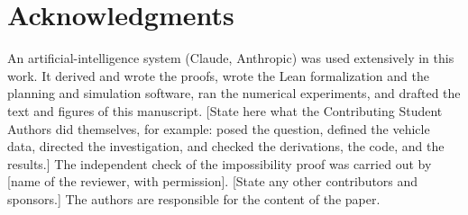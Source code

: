 \section*{Acknowledgments}
An artificial-intelligence system (Claude, Anthropic) was used extensively in this work. It derived and wrote the proofs,
wrote the Lean formalization and the planning and simulation software, ran the numerical experiments, and drafted the text
and figures of this manuscript. [State here what the Contributing Student Authors did themselves, for example: posed the
question, defined the vehicle data, directed the investigation, and checked the derivations, the code, and the results.] The
independent check of the impossibility proof was carried out by [name of the reviewer, with permission]. [State any other
contributors and sponsors.] The authors are responsible for the content of the paper.
